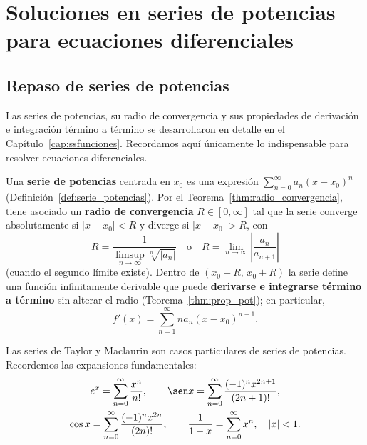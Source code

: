\chapter{Soluciones en series de potencias para ecuaciones diferenciales}

\section{Repaso de series de potencias}

Las series de potencias, su radio de convergencia y sus propiedades de derivación e integración término a término se desarrollaron en detalle en el Capítulo~\ref{cap:ssfunciones}. Recordamos aquí únicamente lo indispensable para resolver ecuaciones diferenciales.

Una \textbf{serie de potencias} centrada en $x_0$ es una expresión $\sum_{n=0}^{\infty} a_n (x-x_0)^n$ (Definición~\ref{def:serie_potencias}). Por el Teorema~\ref{thm:radio_convergencia}, tiene asociado un \textbf{radio de convergencia} $R \in [0,\infty]$ tal que la serie converge absolutamente si $|x-x_0|<R$ y diverge si $|x-x_0|>R$, con
\begin{equation}
  R = \frac{1}{\limsup_{n\to\infty} \sqrt[n]{|a_n|}}
  \quad\text{o}\quad
  R = \lim_{n\to\infty} \left|\frac{a_n}{a_{n+1}}\right|
\end{equation}
(cuando el segundo límite existe). Dentro de $(x_0-R,\,x_0+R)$ la serie define una función infinitamente derivable que puede \textbf{derivarse e integrarse término a término} sin alterar el radio (Teorema~\ref{thm:prop_pot}); en particular,
\begin{equation}
  f'(x)=\sum_{n=1}^{\infty} n a_n (x-x_0)^{n-1}.
\end{equation}

\begin{rem}
  Las series de Taylor y Maclaurin son casos particulares de series de potencias. Recordemos las expansiones fundamentales:
  \begin{gather}
    e^x = \sum_{n=0}^{\infty} \frac{x^n}{n!},\qquad
    \sen x = \sum_{n=0}^{\infty} \frac{(-1)^n x^{2n+1}}{(2n+1)!},\\
    \cos x = \sum_{n=0}^{\infty} \frac{(-1)^n x^{2n}}{(2n)!},\qquad
    \frac{1}{1-x} = \sum_{n=0}^{\infty} x^n,\quad |x|<1.
  \end{gather}
\end{rem}

